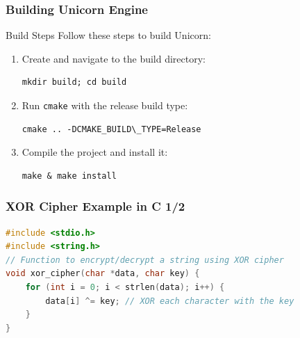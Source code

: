 \begin{frame}[fragile]
\frametitle{Building Unicorn Engine}

\begin{block}{Build Steps}
    Follow these steps to build Unicorn:
    \begin{enumerate}
        \item Create and navigate to the build directory:
        \begin{verbatim}
mkdir build; cd build
        \end{verbatim}
        \item Run \texttt{cmake} with the release build type:
        \begin{verbatim}
cmake .. -DCMAKE_BUILD\_TYPE=Release
        \end{verbatim}
        \item Compile the project and install it:
        \begin{verbatim}
make & make install
        \end{verbatim}

    \end{enumerate}
\end{block}
\end{frame}




\begin{frame}[fragile]
\frametitle{XOR Cipher Example in C 1/2}
\begin{lstlisting}[language=C]
#include <stdio.h>
#include <string.h>
// Function to encrypt/decrypt a string using XOR cipher
void xor_cipher(char *data, char key) {
    for (int i = 0; i < strlen(data); i++) {
        data[i] ^= key; // XOR each character with the key
    }
}
\end{lstlisting}
\end{frame}

